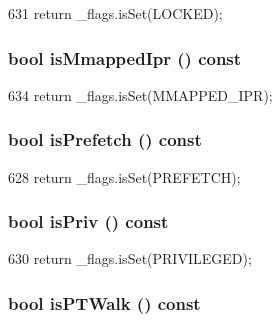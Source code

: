 \begin{DoxyCode}
631 { return _flags.isSet(LOCKED); }
\end{DoxyCode}
\hypertarget{classRequest_aad621c262e009350dd86ad5715c50f7a}{
\subsubsection[{isMmappedIpr}]{\setlength{\rightskip}{0pt plus 5cm}bool isMmappedIpr () const}}
\label{classRequest_aad621c262e009350dd86ad5715c50f7a}



\begin{DoxyCode}
634 { return _flags.isSet(MMAPPED_IPR); }
\end{DoxyCode}
\hypertarget{classRequest_a1eef1bb814a1f77346aba1648fb6d1c9}{
\subsubsection[{isPrefetch}]{\setlength{\rightskip}{0pt plus 5cm}bool isPrefetch () const}}
\label{classRequest_a1eef1bb814a1f77346aba1648fb6d1c9}



\begin{DoxyCode}
628 { return _flags.isSet(PREFETCH); }
\end{DoxyCode}
\hypertarget{classRequest_ab2f3b2dabbe343b396cfbb7b3a0d726b}{
\subsubsection[{isPriv}]{\setlength{\rightskip}{0pt plus 5cm}bool isPriv () const}}
\label{classRequest_ab2f3b2dabbe343b396cfbb7b3a0d726b}



\begin{DoxyCode}
630 { return _flags.isSet(PRIVILEGED); }
\end{DoxyCode}
\hypertarget{classRequest_ad381099a042382bff9eadb1ea6f1a2e1}{
\subsubsection[{isPTWalk}]{\setlength{\rightskip}{0pt plus 5cm}bool isPTWalk () const}}
\label{classRequest_ad381099a042382bff9eadb1ea6f1a2e1}



